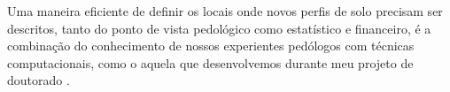Uma maneira eficiente de definir os locais onde novos perfis de solo precisam 
ser descritos, tanto do ponto de vista pedológico como estatístico e financeiro,
é a combinação do conhecimento de nossos experientes pedólogos com técnicas 
computacionais, como o aquela que desenvolvemos durante meu projeto de doutorado
\citep{Samuel-RosaEtAl2015a, Samuel-RosaEtAl2015c, Samuel-RosaEtAl2015d}.
